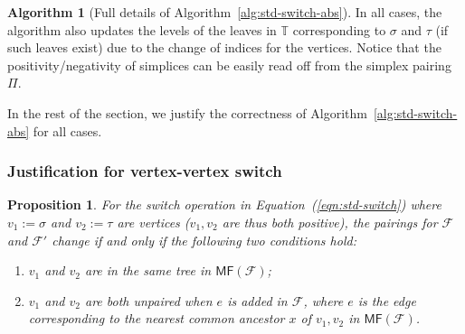 \documentclass[letterpaper,11pt]{article}
\theoremstyle{mythmstyle}
\newtheorem{proposition}[theorem]{Proposition}
\theoremstyle{mydefstyle}
\newtheorem{algr}[algorithm]{Algorithm}
\theoremstyle{plain}
\newtheorem{proposition}[theorem]{Proposition}
\theoremstyle{definition}
\newtheorem{algr}{Algorithm}
\newcommand{\<}[1]{\langle #1\rangle}
\newcommand{\MF}{\mathsf{MF}}
\newcommand{\Fcal}{\mathcal{F}}
\newcommand{\sG}{\sigma}
\newcommand{\tG}{\tau}
\newcommand{\Fpo}{\mathbb{T}}
\theoremstyle{definition}
\begin{document}
\begin{algr}[Full details of Algorithm~\ref{alg:std-switch-abs}]
\noindent In all cases,
the algorithm also updates the levels of the leaves in $\Fpo$ corresponding to $\sG$ and $\tG$
(if such leaves exist) due to the change of indices for the vertices.
Notice that
the positivity/negativity of simplices can be easily read off from the 
simplex pairing $\Pi$.
\end{algr}


In the rest of the section, we justify the correctness of Algorithm~\ref{alg:std-switch-abs}
for all cases. 

\subsubsection{Justification for vertex-vertex switch} 

\begin{proposition}\label{prop:std-vv-pi}
For the switch operation in Equation~(\ref{eqn:std-switch})
where $v_1:=\sG$ and $v_2:=\tG$ are vertices ($v_1,v_2$ are thus both positive),
the pairings for $\Fcal$ and $\Fcal'$  change
if and only if the following two 
conditions hold:
\begin{enumerate}
    \item $v_1$ and $v_2$ are in the same tree in $\MF(\Fcal)$;
    \item $v_1$ and $v_2$ are both  unpaired when 
    $e$ is added in $\Fcal$, where $e$ is 
    the edge corresponding to 
    the nearest common ancestor $x$ of $v_1,v_2$ in $\MF(\Fcal)$.
\end{enumerate}
\end{proposition}
\end{document}
